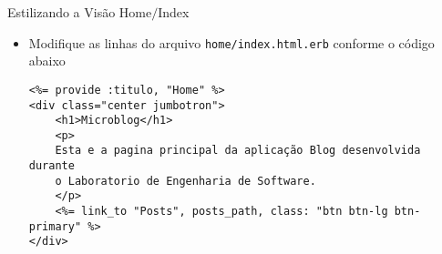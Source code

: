 \begin{frame}{Estilizando a Visão Home$/$Index}
    \begin{itemize}
      \item Modifique as linhas do arquivo \verb|home/index.html.erb| conforme o código abaixo
      \begin{lstlisting}[style=RubyInputStyle, basicstyle=\tiny\ttfamily, caption=app/views/home/index.html.erb]
<%= provide :titulo, "Home" %>
<div class="center jumbotron">
    <h1>Microblog</h1>
    <p>
    Esta e a pagina principal da aplicação Blog desenvolvida durante 
    o Laboratorio de Engenharia de Software.
    </p>
    <%= link_to "Posts", posts_path, class: "btn btn-lg btn-primary" %>
</div>
      \end{lstlisting}
  \end{itemize}
\end{frame} 